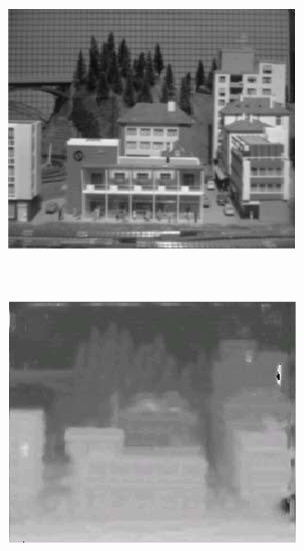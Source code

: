 \begin{figure}
  \label{fig:applications-of-depth-information}
  \centering

  \begin{subfigure}[b]{0.3\textwidth}
    \centering
    \includegraphics[width=\textwidth]{images/input.png}
    \caption{}
  \end{subfigure}
  ~
  \begin{subfigure}[b]{0.3\textwidth}
    \centering
    \includegraphics[width=\textwidth]{images/computed-depth.png}

\end{subfigure}
\end{figure}
